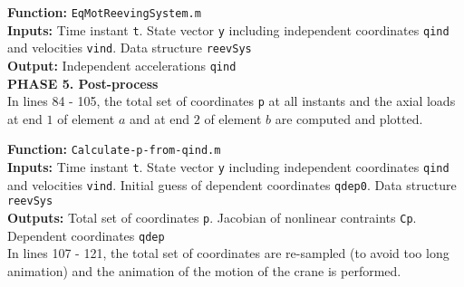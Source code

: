 \setlength{\parindent}{0cm}
\textbf{Function:} \texttt{EqMotReevingSystem.m} \\
\textbf{Inputs:} Time instant \texttt{t}. State vector \texttt{y} including independent coordinates \texttt{qind} and velocities \texttt{vind}. Data structure \texttt{reevSys} \\
\textbf{Output:} Independent accelerations \texttt{qind} \\

\textbf{PHASE 5. Post-process} \\

In lines 84 - 105, the total set of coordinates \texttt{p} at all instants and the axial loads at end $1$ of element $a$ and at end $2$ of element $b$ are computed and plotted. 

\begin{tcolorbox}{\begin{lstlisting}[style=Matlab-editor]
% Calculation of all coordinates all instants %
qdep = reevSys.qdep0;

p = zeros(reevSys.np,length(t));
% Axial load at end '1' of element 'a' %
P1 = zeros(length(t),1);
% Axial load at end '2' of element 'b' %
P2 = zeros(length(t),1);

for i = 1:length(t)
    [p(:,i), Cp, qdep] = Calculate_p_from_qind(t(i),y(i,1:length(reevSys.Ind))',qdep,reevSys);
    P1(i) = AxialLoad(p(7+1:7+17,i),p(7+16,i),reevSys.EA_wr(1),reevSys); 
    P2(i) = AxialLoad(p(7+17+1:7+17+17,i),p(7+17+17,i),reevSys.EA_wr(2),reevSys); 
end

% Plot time-history of axial loads %
figure(20);
plot(t,0.001*P1,'b',t,0.001*P2,'g')
title('Axial load on wire ropes')
xlabel('Time (s)');
ylabel('Axial load (KN)');
legend('End 1 of element a','End 2 of element b');
\end{lstlisting}}}
\end{tcolorbox}

\setlength{\parindent}{0cm}
\textbf{Function:} \texttt{Calculate-p-from-qind.m} \\
\textbf{Inputs:} Time instant \texttt{t}. State vector \texttt{y} including independent coordinates \texttt{qind} and velocities \texttt{vind}. Initial guess of dependent coordinates \texttt{qdep0}. Data structure \texttt{reevSys} \\
\textbf{Outputs:} Total set of coordinates \texttt{p}. Jacobian of nonlinear contraints \texttt{Cp}. Dependent coordinates \texttt{qdep} \\

In lines 107 - 121, the total set of coordinates are re-sampled (to avoid too long animation) and the animation of the motion of the crane is performed.

